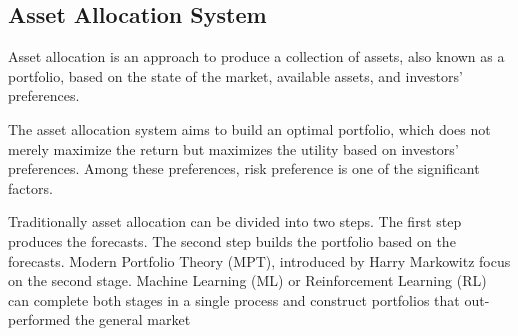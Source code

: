 \subsection {Asset Allocation System}
Asset allocation is an approach to produce a collection of assets, also known as a portfolio, based on the state of the market, available assets, and investors' preferences.

The asset allocation system aims to build an optimal portfolio, which does not merely maximize the return but maximizes the utility based on investors' preferences. Among these preferences, risk preference is one of the significant factors.

Traditionally asset allocation can be divided into two steps. The first step produces the forecasts. The second step builds the portfolio based on the forecasts.  Modern Portfolio Theory (MPT), introduced by  Harry Markowitz \cite{10.2307/2975974} focus on the second stage. Machine Learning (ML) or Reinforcement Learning (RL) can complete both stages in a single process and construct portfolios that out-performed the general market\cite{KRAUSS2017689, moody2001learning}
